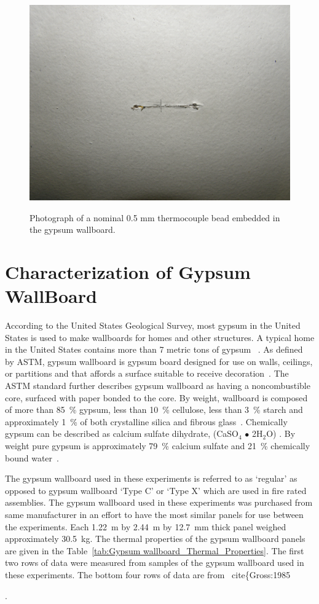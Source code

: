 \documentclass[twoside]{uocthesis}
\begin{document}
{ \begin{figure}
 	\centering
 	\includegraphics[width=\textwidth]{../Figures/IWGB_TC_Slit}\\
 	\caption[Photograph of a thermocouple embedded in the gypsum wallboard]{Photograph of a nominal 0.5 mm thermocouple bead embedded in the gypsum wallboard.}
 	\label{IWGB_TC_Slit}
 \end{figure}


\section{Characterization of Gypsum WallBoard}

According to the United States Geological Survey, most gypsum in the United States is used to make wallboards for homes and other structures.  A typical home in the United States contains more than 7 metric tons of gypsum ~\cite{USGS:2015}.  As defined by ASTM, gypsum wallboard is gypsum board designed for use on walls, ceilings, or partitions and that affords a surface suitable to receive decoration~\cite{ASTM_C1396}. The ASTM standard further describes gypsum wallboard as having a noncombustible core, surfaced with paper bonded to the core. By weight, wallboard is composed of more than 85~\% gypsum, less than 10~\% cellulose, less than 3~\% starch and approximately 1~\% of both crystalline silica and fibrous glass~\cite{GA:2010}. Chemically gypsum can be described as calcium sulfate dihydrate, (CaSO$_{4}$ $\bullet$ 2H$_{2}$O) .  By weight pure gypsum is approximately 79~\% calcium sulfate and 21~\% chemically bound water~\cite{Lawson:1977}.


The gypsum wallboard used in these experiments is referred to as `regular' as opposed to gypsum wallboard `Type C' or `Type X' which are used in fire rated assemblies. The gypsum wallboard used in these experiments was purchased from same manufacturer in an effort to have the most similar panels for use between the experiments. Each 1.22~m by 2.44~m by 12.7~mm thick panel weighed approximately 30.5~kg.  The thermal properties of the gypsum wallboard panels are given in the Table~\ref{tab:Gypsum wallboard_Thermal_Properties}.  The first two rows of data were measured from samples of the gypsum wallboard used in these experiments.  The bottom four rows of data are from ~cite\{Gross:1985}.
\end{document}
